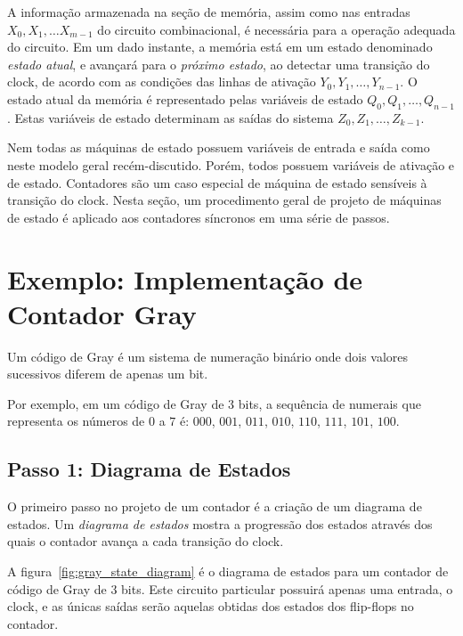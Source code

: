 \documentclass[a4paper]{article}
\begin{document}
A informação armazenada na seção de memória, assim como nas entradas
$X_0, X_1, \ldots X_{m-1}$ do circuito combinacional, é necessária para
a operação adequada do circuito. Em um dado instante, a memória está
em um estado denominado \emph{estado atual}, e avançará para o
\emph{próximo estado}, ao detectar uma transição do clock, de acordo
com as condições das linhas de ativação $Y_0, Y_1, \ldots, Y_{n-1}$.
O estado atual da memória é representado pelas variáveis de estado
$Q_0, Q_1, \ldots, Q_{n-1}$. Estas variáveis de estado determinam as
saídas do sistema $Z_0, Z_1, \ldots, Z_{k-1}$.

Nem todas as máquinas de estado possuem variáveis de entrada e
saída como neste modelo geral recém-discutido. Porém, todos possuem
variáveis de ativação e de estado. Contadores são um caso especial
de máquina de estado sensíveis à transição do clock. Nesta seção, um
procedimento geral de projeto de máquinas de estado é aplicado aos
contadores síncronos em uma série de passos.

\section{Exemplo: Implementação de Contador Gray}
Um código de Gray é um sistema
de numeração binário onde dois valores sucessivos diferem de apenas um bit.

Por exemplo, em um código de Gray de $3$ bits, a sequência de
numerais que representa os números de $0$ a $7$ é:
$000$, $001$, $011$, $010$, $110$, $111$, $101$, $100$.

\subsection{Passo 1: Diagrama de Estados}

O primeiro passo no projeto de um contador é a criação de um diagrama
de estados. Um \emph{diagrama de estados} mostra a progressão dos estados
através dos quais o contador avança a cada transição do clock.

A figura~\ref{fig:gray_state_diagram} é o diagrama de estados
para um contador de código de Gray
de $3$ bits. Este circuito particular possuirá apenas uma entrada, o clock,
e as únicas saídas serão aquelas obtidas dos estados dos flip-flops no
contador.
\end{document}
